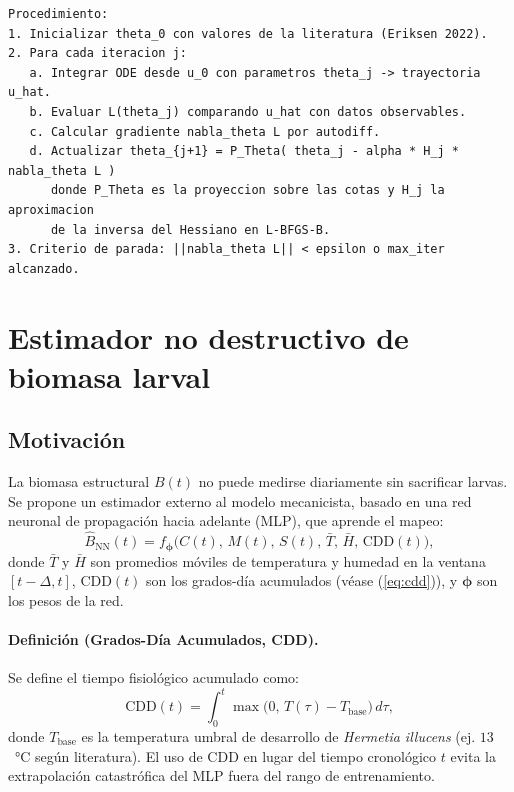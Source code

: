 \begin{verbatim}
Procedimiento:
1. Inicializar theta_0 con valores de la literatura (Eriksen 2022).
2. Para cada iteracion j:
   a. Integrar ODE desde u_0 con parametros theta_j -> trayectoria u_hat.
   b. Evaluar L(theta_j) comparando u_hat con datos observables.
   c. Calcular gradiente nabla_theta L por autodiff.
   d. Actualizar theta_{j+1} = P_Theta( theta_j - alpha * H_j * nabla_theta L )
      donde P_Theta es la proyeccion sobre las cotas y H_j la aproximacion
      de la inversa del Hessiano en L-BFGS-B.
3. Criterio de parada: ||nabla_theta L|| < epsilon o max_iter alcanzado.
\end{verbatim}

\section{Estimador no destructivo de biomasa larval}
\label{sec:estimador}

\subsection{Motivación}

La biomasa estructural $B(t)$ no puede medirse diariamente sin sacrificar larvas. Se propone un estimador externo al modelo mecanicista, basado en una red neuronal de propagación hacia adelante (MLP), que aprende el mapeo:
\begin{equation}
\label{eq:mapa_mlp}
\hat{B}_{\text{NN}}(t) = f_{\boldsymbol{\phi}}\bigl( C(t),\, M(t),\, S(t),\, \bar{T},\, \bar{H},\, \mathrm{CDD}(t) \bigr),
\end{equation}
donde $\bar{T}$ y $\bar{H}$ son promedios móviles de temperatura y humedad en la ventana $[t-\Delta, t]$, $\mathrm{CDD}(t)$ son los grados-día acumulados (véase (\ref{eq:cdd})), y $\boldsymbol{\phi}$ son los pesos de la red.

\paragraph{Definición (Grados-Día Acumulados, CDD).}
Se define el tiempo fisiológico acumulado como:
\begin{equation}
\label{eq:cdd}
\mathrm{CDD}(t) = \int_0^t \max\bigl(0,\, T(\tau) - T_{\text{base}}\bigr) \, d\tau,
\end{equation}
donde $T_{\text{base}}$ es la temperatura umbral de desarrollo de \textit{Hermetia illucens} (ej. $13$~°C según literatura). El uso de CDD en lugar del tiempo cronológico $t$ evita la extrapolación catastrófica del MLP fuera del rango de entrenamiento.

